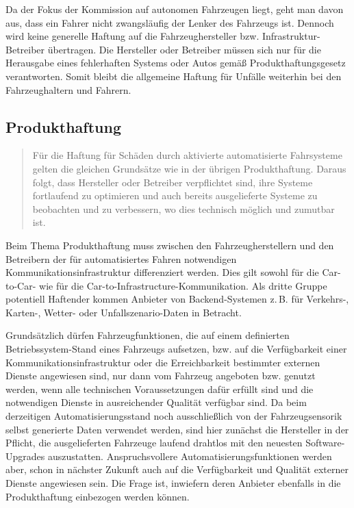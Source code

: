 \documentclass[twoside,a4paper,12pt]{article}
\begin{document}
Da der Fokus der Kommission auf autonomen Fahrzeugen liegt, geht man davon aus, dass ein Fahrer nicht zwangsläufig der Lenker des Fahrzeugs ist. Dennoch wird keine
generelle Haftung auf die Fahrzeughersteller bzw. Infrastruktur-Betreiber übertragen. Die Hersteller oder Betreiber müssen sich nur für die Herausgabe eines fehlerhaften Systems oder Autos gemäß Produkthaftungsgesetz verantworten. Somit bleibt die allgemeine Haftung für Unfälle weiterhin bei den Fahrzeughaltern und Fahrern.\\

\subsection{Produkthaftung} \label{Produkthaftung}

\begin{quote}
\glqq
Für die Haftung für Schäden durch aktivierte automatisierte Fahrsysteme gelten die gleichen Grundsätze wie in der übrigen 
Produkthaftung. Daraus folgt, dass Hersteller oder
Betreiber verpflichtet sind, ihre Systeme fortlaufend zu optimieren und auch bereits ausgelieferte Systeme zu beobachten und zu 
verbessern, wo dies technisch möglich und zumutbar ist.\grqq\mbox{~\cite[S. 12]{ek}}
\end{quote}

Beim Thema Produkthaftung muss zwischen den Fahrzeugherstellern und den Betreibern der für automatisiertes Fahren notwendigen
Kommunikationsinfrastruktur differenziert werden. Dies gilt sowohl für die Car-to-Car- wie für die Car-to-Infrastructure-Kommunikation.
Als dritte Gruppe potentiell Haftender kommen Anbieter von Backend-Systemen z.\,B. für Verkehrs-, Karten-, Wetter- oder Unfallszena\-rio-Daten 
in Betracht. 

Grundsätzlich dürfen Fahrzeugfunktionen, die auf einem definierten \glqq Betriebssys\-tem\grqq-Stand eines Fahrzeugs aufsetzen, bzw. auf die 
Verfügbarkeit einer Kommunikationsinfrastruktur oder die Erreichbarkeit bestimmter externen Dienste angewiesen sind, nur dann vom Fahrzeug 
angeboten bzw. genutzt werden, wenn alle technischen Voraussetzungen dafür erfüllt sind und die notwendigen Dienste in ausreichender 
Qualität verfügbar sind. Da beim derzeitigen Automatisierungsstand noch ausschließlich von der Fahrzeugsensorik selbst generierte Daten verwendet werden, 
sind hier zunächst die Hersteller in der Pflicht, die ausgelieferten Fahrzeuge laufend drahtlos mit den neuesten Software-Upgrades auszustatten.
Anspruchsvollere Automatisierungsfunktionen werden aber, schon in nächster Zukunft auch auf die Verfügbarkeit und Qualität externer Dienste 
angewiesen sein. Die Frage ist, inwiefern deren Anbieter ebenfalls in die Produkthaftung einbezogen werden können.
\end{document}
